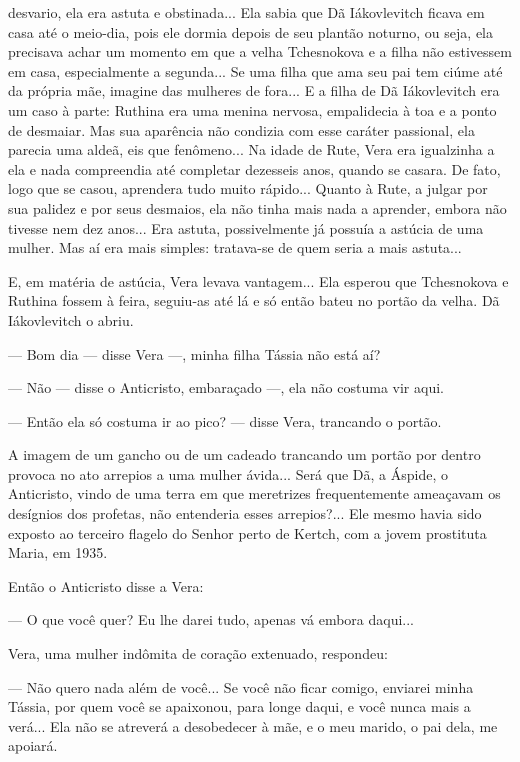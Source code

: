 desvario, ela era astuta e obstinada... Ela sabia que Dã Iákovlevitch
ficava em casa até o meio-dia, pois ele dormia depois de seu plantão
noturno, ou seja, ela precisava achar um momento em que a velha
Tchesnokova e a filha não estivessem em casa, especialmente a segunda...
Se uma filha que ama seu pai tem ciúme até da própria mãe, imagine das
mulheres de fora... E a filha de Dã Iákovlevitch era um caso à parte:
Ruthina era uma menina nervosa, empalidecia à toa e a ponto de desmaiar.
Mas sua aparência não condizia com esse caráter passional, ela parecia
uma aldeã, eis que fenômeno... Na idade de Rute, Vera era igualzinha a
ela e nada compreendia até completar dezesseis anos, quando se casara.
De fato, logo que se casou, aprendera tudo muito rápido... Quanto à
Rute, a julgar por sua palidez e por seus desmaios, ela não tinha mais
nada a aprender, embora não tivesse nem dez anos... Era astuta,
possivelmente já possuía a astúcia de uma mulher. Mas aí era mais
simples: tratava-se de quem seria a mais astuta...

E, em matéria de astúcia, Vera levava vantagem... Ela esperou que
Tchesnokova e Ruthina fossem à feira, seguiu-as até lá e só então bateu
no portão da velha. Dã Iákovlevitch o abriu.

--- Bom dia --- disse Vera ---, minha filha Tássia não está aí?

--- Não --- disse o Anticristo, embaraçado ---, ela não costuma vir
aqui.

--- Então ela só costuma ir ao pico? --- disse Vera, trancando o portão.

A imagem de um gancho ou de um cadeado trancando um portão por dentro
provoca no ato arrepios a uma mulher ávida... Será que Dã, a Áspide, o
Anticristo, vindo de uma terra em que meretrizes frequentemente
ameaçavam os desígnios dos profetas, não entenderia esses arrepios?...
Ele mesmo havia sido exposto ao terceiro flagelo do Senhor perto de
Kertch, com a jovem prostituta Maria, em 1935.

Então o Anticristo disse a Vera:

--- O que você quer? Eu lhe darei tudo, apenas vá embora daqui...

Vera, uma mulher indômita de coração extenuado, respondeu:

--- Não quero nada além de você... Se você não ficar comigo, enviarei
minha Tássia, por quem você se apaixonou, para longe daqui, e você nunca
mais a verá... Ela não se atreverá a desobedecer à mãe, e o meu marido,
o pai dela, me apoiará.

